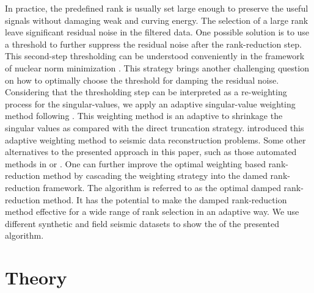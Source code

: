 In practice, the predefined rank is usually set large enough to preserve the useful signals without damaging weak and curving energy. The selection of a large rank  leave significant residual noise in the filtered data. One possible solution is to use a threshold to further suppress the residual noise after the rank-reduction step. This second-step thresholding can be understood conveniently in the framework of nuclear norm minimization . This strategy brings another challenging question on how to optimally choose the threshold for damping the residual noise. Considering that the thresholding step can be interpreted as a re-weighting process for the singular-values, we apply an adaptive singular-value weighting method following \cite{optshrink2013}. This weighting method is an adaptive to shrinkage the singular values as compared with the direct truncation strategy. \cite{aharchaou2017singular} introduced this adaptive weighting method to seismic data reconstruction problems. Some other alternatives to the presented approach in this paper, such as  those automated methods in \cite[]{gavish2014optimal} or \cite{trickett2015preserving}. One can further improve the optimal weighting based rank-reduction method by cascading the weighting strategy into the damed rank-reduction framework. The  algorithm is referred to as the optimal damped rank-reduction  method. It has the potential to make the damped rank-reduction method effective for a wide range of rank selection in an adaptive way.  We use different synthetic and field seismic datasets to show the  of the presented algorithm.


 
\section{Theory}


